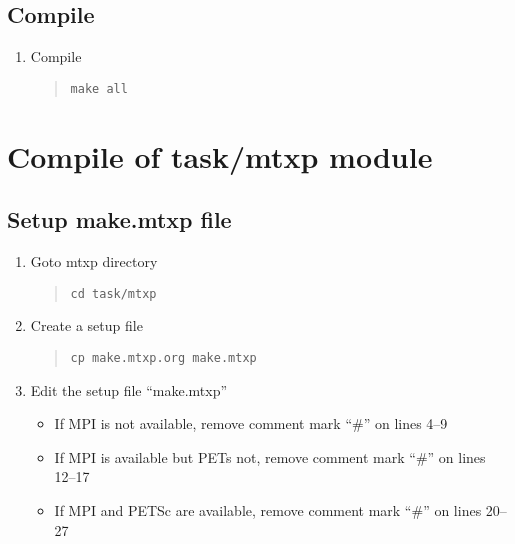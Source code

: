 \documentclass[11pt]{article}
\begin{document}
\subsection{Compile}
\begin{enumerate}
\item
Compile
\begin{quote}
\begin{verbatim}
make all
\end{verbatim}
\end{quote}
\end{enumerate}

\section{Compile of task/mtxp module}

\subsection{Setup make.mtxp file}
\begin{enumerate}
\item
Goto mtxp directory
\begin{quote}
\begin{verbatim}
cd task/mtxp
\end{verbatim}
\end{quote}
\item
Create a setup file 
\begin{quote}
\begin{verbatim}
cp make.mtxp.org make.mtxp
\end{verbatim}
\end{quote}
\item
Edit the setup file ``make.mtxp''
\begin{itemize}
\item
If MPI is not available, 
remove comment mark ``\#'' on lines 4--9
\item
If MPI is available but PETs not, 
remove comment mark ``\#'' on lines 12--17
\item
If MPI and PETSc are available, 
remove comment mark ``\#'' on lines 20--27
\end{itemize}
\end{enumerate}
\end{document}
